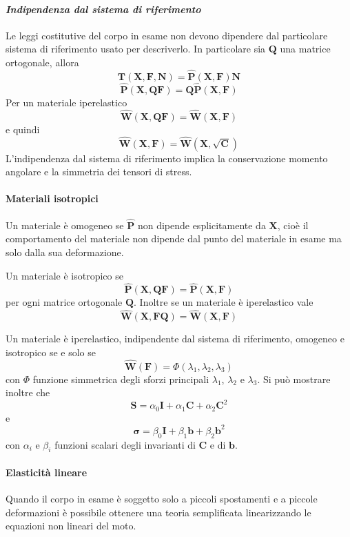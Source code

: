 \paragraph{\emph{Indipendenza dal sistema di riferimento}}
Le leggi costitutive del corpo in esame non devono dipendere dal particolare sistema di riferimento usato per descriverlo.
In particolare sia $\mathbf{Q}$ una matrice ortogonale, allora 
$$\mathbf{T}(\mathbf{X},\mathbf{F},\mathbf{N}) = \widehat{\mathbf{P}}(\mathbf{X},\mathbf{F})\mathbf{N} $$
$$\widehat{\mathbf{P}}(\mathbf{X},\mathbf{Q}\mathbf{F}) = \mathbf{Q}\widehat{\mathbf{P}}(\mathbf{X},\mathbf{F}) $$
Per un materiale iperelastico 
$$\widehat{\mathbf{W}}(\mathbf{X},\mathbf{Q}\mathbf{F}) = \widehat{\mathbf{W}}(\mathbf{X},\mathbf{F}) $$
e quindi
$$\widehat{\mathbf{W}}(\mathbf{X},\mathbf{F}) = \widehat{\mathbf{W}}(\mathbf{X},\sqrt{\mathbf{C}}) $$
L'indipendenza dal sistema di riferimento implica la conservazione momento angolare e la simmetria dei tensori di stress.
\paragraph{Materiali isotropici}
Un materiale è omogeneo se $\widehat{\mathbf{P}}$ non dipende esplicitamente da $\mathbf{X}$, cioè il comportamento del materiale non dipende dal punto del materiale in esame ma solo dalla sua deformazione.

Un materiale è isotropico se
$$\widehat{\mathbf{P}}(\mathbf{X},\mathbf{Q}\mathbf{F}) = \widehat{\mathbf{P}}(\mathbf{X},\mathbf{F}) $$
per ogni matrice ortogonale $\mathbf{Q}$.
Inoltre se un materiale è iperelastico vale 
$$\widehat{\mathbf{W}}(\mathbf{X},\mathbf{F}\mathbf{Q}) = \widehat{\mathbf{W}}(\mathbf{X},\mathbf{F}) $$

Un materiale è iperelastico, indipendente dal sistema di riferimento, omogeneo e isotropico se e solo se
$$\widehat{\mathbf{W}}(\mathbf{F}) = \Phi(\lambda_1,\lambda_2,\lambda_3) $$
con $\Phi$ funzione simmetrica degli sforzi principali $\lambda_1$, $\lambda_2$ e $\lambda_3$.
Si può mostrare inoltre che
$$\mathbf{S}=\alpha_0\mathbf{I}+\alpha_1\mathbf{C}+\alpha_2\mathbf{C}^2 $$
e
$$\boldsymbol{\sigma}=\beta_0\mathbf{I}+\beta_1\mathbf{b}+\beta_2\mathbf{b}^2 $$
con $\alpha_i$ e $\beta_i$ funzioni scalari degli invarianti di $\mathbf{C}$  e di $\mathbf{b}$.
\paragraph{Elasticità lineare}
Quando il corpo in esame è soggetto solo a piccoli spostamenti e a piccole deformazioni è possibile ottenere una teoria semplificata linearizzando le equazioni non lineari del moto.


